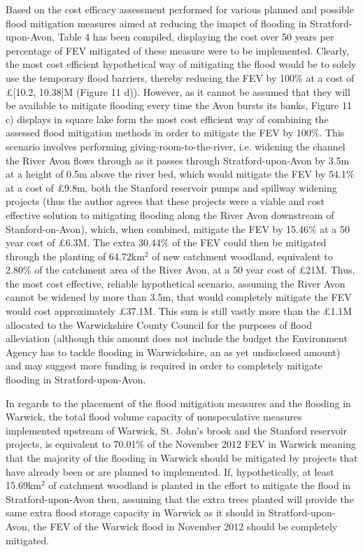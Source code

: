 \documentclass[11pt,a4paper]{article}
\begin{document}
Based on the cost efficacy assessment performed for various planned and possible flood mitigation measures aimed at reducing the imapct of flooding in Stratford-upon-Avon, Table 4 has been compiled, displaying the cost over 50 years per percentage of FEV mitigated of these measure were to be implemented. Clearly, the most cost efficient hypothetical way of mitigating the flood would be to solely use the temporary flood barriers, thereby reducing the FEV by 100\% at a cost of \pounds[10.2, 10.38]M (Figure 11 d)). However, as it cannot be assumed that they will be available to mitigate flooding every time the Avon bursts its banks, Figure 11 c) displays in square lake form the most cost efficient way of combining the assessed flood mitigation methods in order to mitigate the FEV by 100\%. This scenario involves performing giving-room-to-the-river, i.e. widening the channel the River Avon flows through as it passes through Stratford-upon-Avon by 3.5m at a height of 0.5m above the river bed, which would mitigate the FEV by 54.1\% at a cost of \pounds9.8m, both the Stanford reservoir pumps and spillway widening projects (thus the author agrees that these projects were a viable and cost effective solution to mitigating flooding along the River Avon downstream of Stanford-on-Avon), which, when combined, mitigate the FEV by 15.46\% at a 50 year cost of \pounds6.3M. The extra 30.44\% of the FEV could then be mitigated through the planting of 64.72km$^2$ of new catchment woodland, equivalent to 2.80\% of the catchment area of the River Avon, at a 50 year cost of \pounds21M. Thus, the most cost effective, reliable hypothetical scenario, assuming the River Avon cannot be widened by more than 3.5m, that would completely mitigate the FEV would cost approximately \pounds37.1M. This sum is still vastly more than the \pounds1.1M allocated to the Warwickshire County Council \cite{war1} for the purposes of flood alleviation (although this amount does not include the budget the Environment Agency has to tackle flooding in Warwickshire, an as yet undisclosed amount) and may suggest more funding is required in order to completely mitigate flooding in Stratford-upon-Avon.

In regards to the placement of the flood mitigation measures and the flooding in Warwick, the total flood volume capacity of nonspeculative measures implemented upstream of Warwick, St. John's brook and the Stanford reservoir projects, is equivalent to 70.01\% of the November 2012 FEV in Warwick meaning that the majority of the flooding in Warwick should be mitigated by projects that have already been or are planned to implemented. If, hypothetically, at least 15.69km$^2$ of catchment woodland is planted in the effort to mitigate the flood in Stratford-upon-Avon then, assuming that the extra trees planted will provide the same extra flood storage capacity in Warwick as it should in Stratford-upon-Avon, the FEV of the Warwick flood in November 2012 should be completely mitigated.
\end{document}

